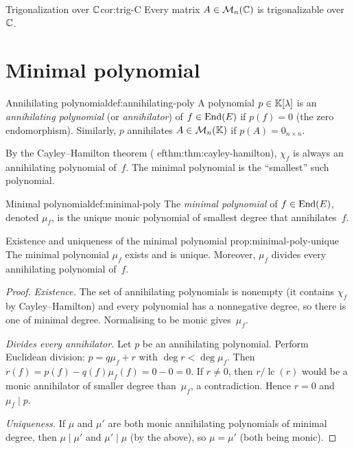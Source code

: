 \begin{corollary}{Trigonalization over ${\mathbb{C}}$}{cor:trig-C}
Every matrix $A\in\mathcal{M}_n({\mathbb{C}})$ is trigonalizable over~${\mathbb{C}}$.
\end{corollary}


\section{Minimal polynomial}\label{sec:minimal-poly}

\begin{definition}{Annihilating polynomial}{def:annihilating-poly}
A polynomial $p\in{\mathbb{K}}[\lambda]$ is an \emph{annihilating polynomial}
(or \emph{annihilator}) of $f\in\operatorname{End}(E)$ if $p(f) = 0$ (the zero
endomorphism).  Similarly, $p$ annihilates $A\in\mathcal{M}_n({\mathbb{K}})$ if
$p(A) = 0_{n\times n}$.
\end{definition}

By the Cayley--Hamilton theorem (
ef{thm:thm:cayley-hamilton}), $\chi_f$
is always an annihilating polynomial of~$f$.  The minimal polynomial
is the ``smallest'' such polynomial.

\begin{definition}{Minimal polynomial}{def:minimal-poly}
The \emph{minimal polynomial} of $f\in\operatorname{End}(E)$, denoted $\mu_f$, is
the unique monic polynomial of smallest degree that annihilates~$f$.
\end{definition}

\begin{proposition}{Existence and uniqueness of the minimal polynomial}%
{prop:minimal-poly-unique}
The minimal polynomial $\mu_f$ exists and is unique.  Moreover, $\mu_f$
divides every annihilating polynomial of~$f$.
\end{proposition}

\begin{proof}
\textit{Existence.}\; The set of annihilating polynomials is nonempty
(it contains $\chi_f$ by Cayley--Hamilton) and every polynomial has a
nonnegative degree, so there is one of minimal degree.  Normalising
to be monic gives~$\mu_f$.

\textit{Divides every annihilator.}\; Let $p$ be an annihilating
polynomial.  Perform Euclidean division: $p = q\mu_f + r$ with
$\deg r < \deg\mu_f$.  Then $r(f) = p(f) - q(f)\mu_f(f) = 0 - 0 = 0$.
If $r \neq 0$, then $r/\operatorname{lc}(r)$ would be a monic
annihilator of smaller degree than~$\mu_f$, a contradiction.  Hence
$r = 0$ and $\mu_f \mid p$.

\textit{Uniqueness.}\; If $\mu$ and $\mu'$ are both monic annihilating
polynomials of minimal degree, then $\mu \mid \mu'$ and $\mu' \mid \mu$
(by the above), so $\mu = \mu'$ (both being monic).
\end{proof}


